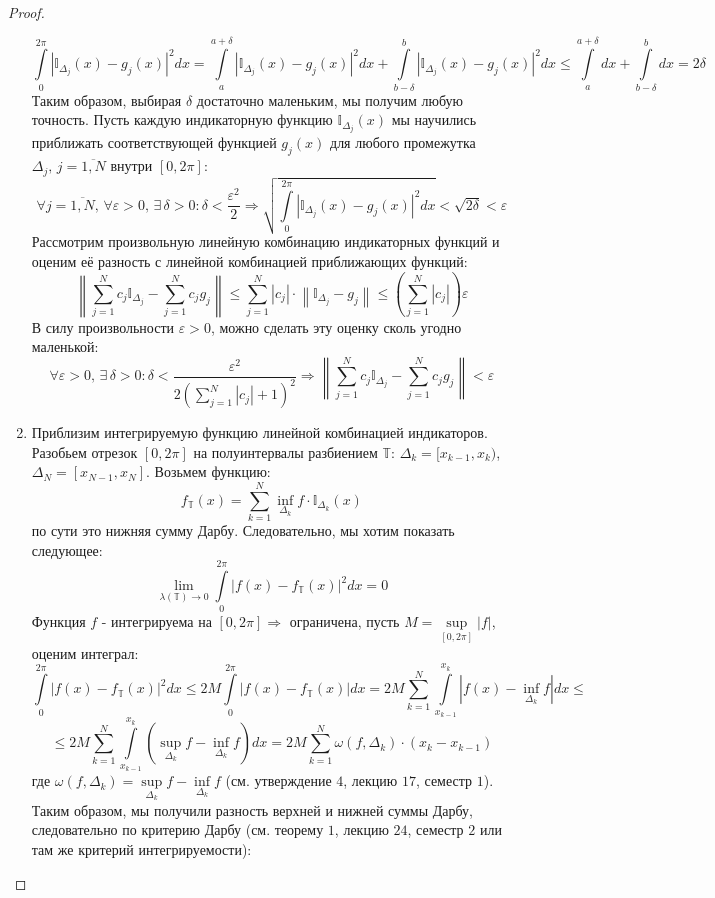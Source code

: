 \documentclass[12pt]{article}
\newcommand{\MTB}{\mathbb{T}}
\newcommand{\MTI}{\mathbb{I}}
\newcommand{\VE}{\varepsilon}
\theoremstyle{definition}
\newcommand{\ddsum}[2]{\displaystyle\sum\limits_{#1}^{#2}}
\newcommand{\ddint}[2]{\displaystyle\int\limits_{#1}^{#2}}
\begin{document}
\begin{proof}
\begin{enumerate}[label=\arabic*)]
		$$
			\ddint{0}{2\pi}|\MTI_{\Delta_j}(x) - g_j(x)|^2dx = \ddint{a}{a+\delta}|\MTI_{\Delta_j}(x) - g_j(x)|^2dx + \ddint{b - \delta}{b}|\MTI_{\Delta_j}(x) - g_j(x)|^2dx \leq \ddint{a}{a+\delta}dx + \ddint{b - \delta}{b}dx = 2\delta
		$$
		Таким образом, выбирая $\delta$ достаточно маленьким, мы получим любую точность. Пусть каждую индикаторную функцию $\MTI_{\Delta_j}(x)$ мы научились приближать соответствующей функцией $g_j(x)$ для любого промежутка $\Delta_j, \, j = \overline{1,N}$ внутри $[0,2\pi]$:
		$$
			\forall j = \overline{1,N}, \, \forall \VE > 0, \, \exists \, \delta > 0 \colon \delta < \dfrac{\VE^2}{2} \Rightarrow
			\sqrt{\ddint{0}{2\pi}\left|\MTI_{\Delta_j}(x) - g_j(x)\right|^2dx } < \sqrt{2\delta} < \VE
		$$
		Рассмотрим произвольную линейную комбинацию индикаторных функций и оценим её разность с линейной комбинацией приближающих функций:
		$$
			\left\|\ddsum{j = 1}{N}c_j\MTI_{\Delta_j} - \ddsum{j = 1}{N}c_j g_j\right\| \leq \ddsum{j = 1}{N}|c_j|{\cdot}\left\|\MTI_{\Delta_j} - g_j\right\| \leq \left(\ddsum{j = 1}{N}|c_j|\right)\VE 
		$$
		В силу произвольности $\VE>0$, можно сделать эту оценку сколь угодно маленькой:
		$$
			\forall \VE > 0, \, \exists \, \delta > 0 \colon \delta <  \dfrac{\VE^2}{2\left(\sum\limits_{j = 1}^{N}|c_j| + 1\right)^2} \Rightarrow \left\|\ddsum{j = 1}{N}c_j\MTI_{\Delta_j} - \ddsum{j = 1}{N}c_j g_j\right\| < \VE
		$$
		\setcounter{enumi}{0}
		\item Приблизим интегрируемую функцию линейной комбинацией индикаторов. Разобьем отрезок $[0,2\pi]$ на полуинтервалы разбиением $\MTB$: $\Delta_k = [x_{k-1}, x_k)$, $\Delta_N = [x_{N-1},x_N]$. Возьмем функцию:
		$$
			f_{\MTB}(x) = \ddsum{k = 1}{N}\inf\limits_{\Delta_k}f{\cdot}\MTI_{\Delta_k}(x)
		$$
		по сути это нижняя сумму Дарбу. Следовательно, мы хотим показать следующее:
		$$
			\lim\limits_{\lambda(\MTB) \to 0}\ddint{0}{2\pi}|f(x) - f_{\MTB}(x)|^2 dx = 0
		$$
		Функция $f$ - интегрируема на $[0,2\pi] \Rightarrow$ ограничена, пусть $M = \sup\limits_{[0,2\pi]}|f|$, оценим интеграл:
		$$
			\ddint{0}{2\pi}|f(x) - f_{\MTB}(x)|^2 dx \leq 2M\ddint{0}{2\pi}|f(x) - f_{\MTB}(x)|dx = 2M\ddsum{k = 1}{N}\ddint{x_{k-1}}{x_k}\left|f(x) - \inf\limits_{\Delta_k}f\right|dx \leq
		$$
		$$
			\leq 2M\ddsum{k = 1}{N}\ddint{x_{k-1}}{x_k}\left(\sup\limits_{\Delta_k}f - \inf\limits_{\Delta_k}f\right)dx = 2M\ddsum{k = 1}{N}\omega(f,\Delta_k){\cdot}(x_{k} - x_{k-1}) 
		$$
		где $\omega(f,\Delta_k) = \sup\limits_{\Delta_k}f - \inf\limits_{\Delta_k}f$ (см. утверждение $4$, лекцию $17$, семестр $1$). Таким образом, мы получили разность верхней и нижней суммы Дарбу, следовательно по критерию Дарбу (см. теорему $1$, лекцию $24$, семестр $2$ или там же критерий интегрируемости):

\end{enumerate}
\end{proof}
\end{document}
